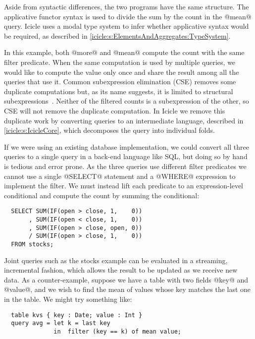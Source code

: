 Aside from syntactic differences, the two programs have the same structure.
The applicative functor syntax is used to divide the sum by the count in the @mean@ query.
Icicle uses a modal type system to infer whether applicative syntax would be required, as described in \autoref{icicle:s:ElementsAndAggregates:TypeSystem}.

In this example, both @more@ and @mean@ compute the count with the same filter predicate.
When the same computation is used by multiple queries, we would like to compute the value only once and share the result among all the queries that use it.
Common subexpression elimination (CSE) removes some duplicate computations but, as its name suggests, it is limited to structural subexpressions~\cite{chitil1997common}.
Neither of the filtered counts is a subexpression of the other, so CSE will not remove the duplicate computation.
In Icicle we remove this duplicate work by converting queries to an intermediate language, described in \autoref{icicle:s:IcicleCore}, which decomposes the query into individual folds.

If we were using an existing database implementation, we could convert all three queries to a single query in a back-end language like SQL, but doing so by hand is tedious and error prone.
As the three queries use different filter predicates we cannot use a single @SELECT@ statement and a @WHERE@ expression to implement the filter.
We must instead lift each predicate to an expression-level conditional and compute the count by summing the conditional:
\begin{lstlisting}
  SELECT SUM(IF(open > close, 1,    0))
       , SUM(IF(open < close, 1,    0))
       , SUM(IF(open > close, open, 0))
       / SUM(IF(open > close, 1,    0))
  FROM stocks;
\end{lstlisting}


Joint queries such as the stocks example can be evaluated in a streaming, incremental fashion, which allows the result to be updated as we receive new data.
As a counter-example, suppose we have a table with two fields @key@ and @value@, and we wish to find the mean of values whose key matches the last one in the table.
We might try something like:
\begin{lstlisting}
  table kvs { key : Date; value : Int }
  query avg = let k = last key
              in  filter (key == k) of mean value;
\end{lstlisting}

